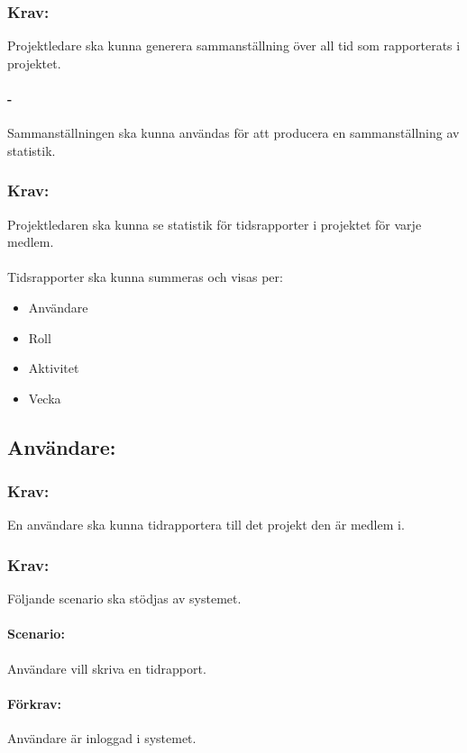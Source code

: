 \documentclass[paper=a4, fontsize=11pt,twoside]{article}
\begin{document}
\paragraph{}

\subsubsection*{Krav:}
Projektledare ska kunna generera sammanställning över all tid som rapporterats i projektet.
\paragraph{-}
Sammanställningen ska kunna användas för att producera en sammanställning av statistik.

\subsubsection*{Krav:}
Projektledaren ska kunna se statistik för tidsrapporter i projektet för varje medlem.
\paragraph{}
Tidsrapporter ska kunna summeras och visas per:
\begin{itemize}
\item Användare
\item Roll
\item Aktivitet
\item Vecka
\end{itemize}
\subsection{Användare:}
\subsubsection{Krav:} En användare ska kunna tidrapportera till det projekt den är medlem i.
\subsubsection{Krav:} Följande scenario ska stödjas av systemet.
\paragraph{Scenario:} Användare vill skriva en tidrapport.
\paragraph{Förkrav:}
Användare är inloggad i systemet.
 
\end{document}
